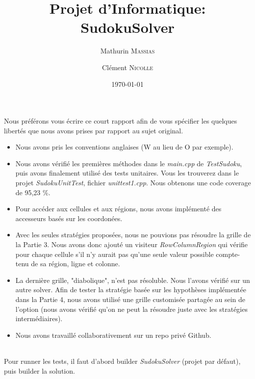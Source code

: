 \documentclass[11pt,a4paper]{article}
\title{Projet d'Informatique: SudokuSolver}
\author{Mathurin \textsc{Massias} \and Clément \textsc{Nicolle}}
\date{\today}
\begin{document}
	
\maketitle

Nous préférons vous écrire ce court rapport afin de vous spécifier les quelques libertés que nous avons prises par rapport au sujet original.
\\
\begin{itemize}
	\item Nous avons pris les conventions anglaises (W au lieu de O par exemple).
	\\
	\item Nous avons vérifié les premières méthodes dans le \textit{main.cpp} de \textit{TestSudoku}, puis avons finalement utilisé des tests unitaires. Vous les trouverez dans le projet \textit{SudokuUnitTest}, fichier \textit{unittest1.cpp}. Nous obtenons une code coverage de 95,23 \%.
	\\
	\item Pour accéder aux cellules et aux régions, nous avons implémenté des accesseurs basés sur les coordonées.
	\\
	\item Avec les seules stratégies proposées, nous ne pouvions pas résoudre la grille de la Partie 3. Nous avons donc ajouté un visiteur \textit{RowColumnRegion} qui vérifie pour chaque cellule s'il n'y aurait pas qu'une seule valeur possible compte-tenu de sa région, ligne et colonne.
	\\
	\item La dernière grille, "diabolique", n'est pas résoluble. Nous l'avons vérifié sur un autre solver. Afin de tester la stratégie basée sur les hypothèses implémentée dans la Partie 4, nous avons utilisé une grille customisée partagée au sein de l'option (nous avons vérifié qu'on ne peut la résoudre juste avec les stratégies intermédiaires).
	\\
	\item Nous avons travaillé collaborativement sur un repo privé Github.
\end{itemize}
%
\hspace{3mm}
\\
Pour runner les tests, il faut d'abord builder \textit{SudokuSolver} (projet par défaut), puis builder la solution.
\end{document}
